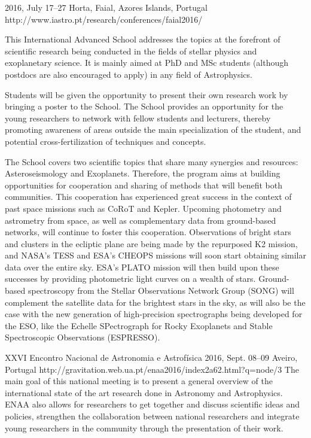 {2016, July 17--27}%
{Horta, Faial, Azores Islands, Portugal}%
{http://www.iastro.pt/research/conferences/faial2016/}%
{}%
{This International Advanced School addresses the topics at the forefront of scientific research being conducted in the fields of stellar physics and exoplanetary science. It is mainly aimed at PhD and MSc students (although postdocs are also encouraged to apply) in any field of Astrophysics.

Students will be given the opportunity to present their own research work by bringing a poster to the School. The School provides an opportunity for the young researchers to network with fellow students and lecturers, thereby promoting awareness of areas outside the main specialization of the student, and potential cross-fertilization of techniques and concepts.

The School covers two scientific topics that share many synergies and resources: Asteroseismology and Exoplanets. Therefore, the program aims at building opportunities for cooperation and sharing of methods that will benefit both communities. This cooperation has experienced great success in the context of past space missions such as CoRoT and Kepler. Upcoming photometry and astrometry from space, as well as complementary data from ground-based networks, will continue to foster this cooperation. Observations of bright stars and clusters in the ecliptic plane are being made by the repurposed K2 mission, and NASA's TESS and ESA's CHEOPS missions will soon start obtaining similar data over the entire sky. ESA's PLATO mission will then build upon these successes by providing photometric light curves on a wealth of stars. Ground-based spectroscopy from the Stellar Observations Network Group (SONG) will complement the satellite data for the brightest stars in the sky, as will also be the case with the new generation of high-precision spectrographs being developed for the ESO, like the Echelle SPectrograph for Rocky Exoplanets and Stable Spectroscopic Observations (ESPRESSO).}%

 {XXVI Encontro Nacional de Astronomia e Astrofísica}%
{2016, Sept. 08--09}%
{Aveiro, Portugal}%
{http://gravitation.web.ua.pt/enaa2016/index2a62.html?q=node/3}%
{}%
{The main goal of this national meeting is to present a general overview of the international state of the art research done in Astronomy and Astrophysics. ENAA also allows for researchers to get together and discuss scientific ideas and policies, strengthen the collaboration between national researchers and integrate young researchers in the community through the presentation of their work.}


